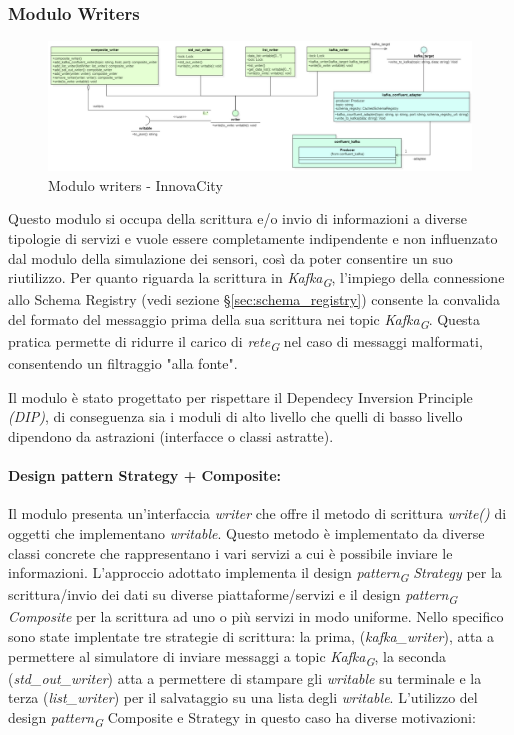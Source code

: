 \subsubsection{Modulo Writers} \label{sec:writersModule} 

\begin{figure}[H]
    \centering
    \includegraphics[width=1.1\textwidth]{../Images/SpecificaTecnica/writerModule.PNG}
    \caption{Modulo writers - InnovaCity}
    \label{fig: writersModule}
\end{figure}

Questo modulo si occupa della scrittura e/o invio di informazioni a diverse tipologie di servizi e vuole essere completamente indipendente e non influenzato dal modulo della simulazione dei sensori, così da poter consentire un suo riutilizzo.
Per quanto riguarda la scrittura in \textit{Kafka}\textsubscript{\textit{G}}, l'impiego della connessione allo Schema Registry (vedi sezione \S\ref{sec:schema_registry}) consente la convalida del formato del messaggio prima della sua scrittura nei topic \textit{Kafka}\textsubscript{\textit{G}}. Questa pratica permette di ridurre il carico di \textit{rete}\textsubscript{\textit{G}} nel caso di messaggi malformati, consentendo un filtraggio "alla fonte".

Il modulo è stato progettato per rispettare il Dependecy Inversion Principle \textit{(DIP)}, di conseguenza sia i moduli di alto livello che quelli di basso livello dipendono da astrazioni (interfacce o classi astratte).

\paragraph{Design pattern Strategy + Composite:}
Il modulo presenta un'interfaccia \textit{writer} che offre il metodo di scrittura \textit{write()} di oggetti che implementano \textit{writable}.
Questo metodo è implementato da diverse classi concrete che rappresentano i vari servizi a cui è possibile inviare le informazioni.
L'approccio adottato implementa il design \textit{pattern}\textsubscript{\textit{G}} \textit{Strategy} per la scrittura/invio dei dati su diverse piattaforme/servizi e il design \textit{pattern}\textsubscript{\textit{G}} \textit{Composite} per la scrittura ad uno o più servizi in modo uniforme.
Nello specifico sono state implentate tre strategie di scrittura: la prima, (\textit{kafka\_writer}), atta a permettere al simulatore di inviare messaggi a topic \textit{Kafka}\textsubscript{\textit{G}},  la seconda (\textit{std\_out\_writer}) atta a permettere di stampare gli \textit{writable} su terminale e la terza (\textit{list\_writer}) per il salvataggio su una lista degli \textit{writable}.
L'utilizzo del design \textit{pattern}\textsubscript{\textit{G}} Composite e Strategy in questo caso ha diverse motivazioni:

